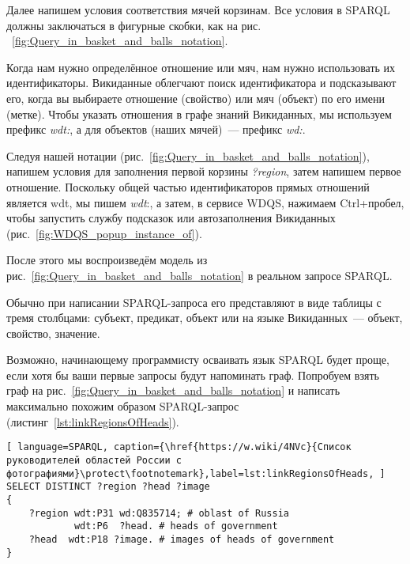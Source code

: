 Далее напишем условия соответствия мячей корзинам. Все условия в SPARQL должны заключаться в фигурные скобки, как на рис. ~\ref{fig:Query_in_basket_and_balls_notation}.

Когда нам нужно определённое отношение или мяч, нам нужно использовать их идентификаторы. Викиданные облегчают поиск идентификатора и подсказывают его, когда вы выбираете отношение (свойство) или мяч (объект) по его имени (метке). Чтобы указать отношения в графе знаний Викиданных, мы используем префикс \textit{wdt:}, а для объектов (наших мячей)~--- префикс \textit{wd:}.

Следуя нашей нотации (рис.~\ref{fig:Query_in_basket_and_balls_notation}), напишем условия для заполнения первой корзины \textit{?region}, затем напишем первое отношение. Поскольку общей частью идентификаторов прямых отношений является wdt, мы пишем \textit{wdt}:, а затем, в сервисе WDQS, нажимаем Ctrl+пробел, чтобы запустить службу подсказок или  автозаполнения Викиданных (рис.~\ref{fig:WDQS_popup_instance_of}).

\begin{marginfigure}[-2.5cm]
	{
		\setlength{\fboxsep}{0pt}%
		\setlength{\fboxrule}{1pt}%
	}
    \caption{С помощью команды Ctrl+пробел открылось выпадающее контекстное меню автозаполнения свойства Викиданых.}
	\label{fig:WDQS_popup_instance_of}
\end{marginfigure}

После этого мы воспроизведём модель из рис.~\ref{fig:Query_in_basket_and_balls_notation} в реальном запросе SPARQL.

Обычно при написании SPARQL-запроса его представляют в виде таблицы с тремя столбцами: субъект, предикат, объект или на языке Викиданных~--- объект, свойство, значение.

Возможно, начинающему программисту осваивать язык SPARQL будет проще, если хотя бы ваши первые запросы будут напоминать граф. Попробуем взять граф на рис.~\ref{fig:Query_in_basket_and_balls_notation} и написать максимально похожим образом SPARQL-запрос (листинг~\ref{lst:linkRegionsOfHeads}).

\begin{lstlisting}[ language=SPARQL, caption={\href{https://w.wiki/4NVc}{Список руководителей областей России с фотографиями}\protect\footnotemark},label=lst:linkRegionsOfHeads, ]
SELECT DISTINCT ?region ?head ?image
{
    ?region wdt:P31 wd:Q835714; # oblast of Russia
            wdt:P6  ?head. # heads of government
    ?head  wdt:P18 ?image. # images of heads of government
}
\end{lstlisting}

